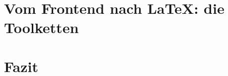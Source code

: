 \documentclass[
  DIV=calc,
  BCOR=5mm,
  12pt,
  headings=small,
  twoside,
  abstract=true,
  toc=bib,
  xcolor=dvipsnames,
  openany,
  english,ngerman]{scrbook}
\begin{document}
 

 


\newpage
 

 

 

 

 



 



 

 

 

 

 
 
 

 

 

\chapter{Vom Frontend nach \LaTeX: die Toolketten}
 
 
 

\chapter{Fazit}

%


%
\printnomenclature


\end{document}
